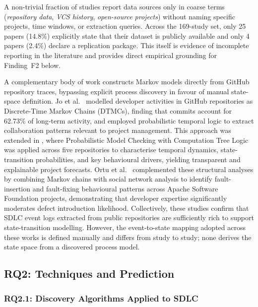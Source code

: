 A non-trivial fraction of studies report data sources only in coarse terms
(\textit{repository data}, \textit{VCS history}, \textit{open-source
projects}) without naming specific projects, time windows, or extraction
queries. Across the 169-study set, only 25 papers (14.8\%) explicitly state
that their dataset is publicly available and only 4 papers (2.4\%) declare a
replication package. This itself is evidence of incomplete reporting in the
literature and provides direct empirical grounding for Finding~F2 below.

A complementary body of work constructs Markov models directly from GitHub
repository traces, bypassing explicit process discovery in favour of manual
state-space definition. Jo et al.\ \cite{jo2023} modelled developer activities
in GitHub repositories as Discrete-Time Markov Chains (DTMCs), finding that
commits account for 62.73\% of long-term activity, and employed probabilistic
temporal logic to extract collaboration patterns relevant to project management.
This approach was extended in \cite{jo2024}, where Probabilistic Model Checking
with Computation Tree Logic was applied across five repositories to characterise
temporal dynamics, state-transition probabilities, and key behavioural drivers,
yielding transparent and explainable project forecasts. Ortu et al.\ \cite{ortu2023}
complemented these structural analyses by combining Markov chains with social
network analysis to identify fault-insertion and fault-fixing behavioural patterns
across Apache Software Foundation projects, demonstrating that developer expertise
significantly moderates defect introduction likelihood. Collectively, these studies
confirm that SDLC event logs extracted from public repositories are sufficiently
rich to support state-transition modelling. However, the event-to-state mapping
adopted across these works is defined manually and differs from study to study;
none derives the state space from a discovered process model.


\subsection{RQ2: Techniques and Prediction}
\label{sec:slr-rq2}

\subsubsection{RQ2.1: Discovery Algorithms Applied to SDLC}

